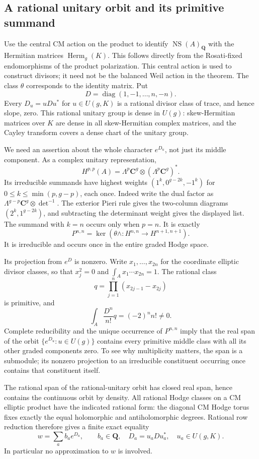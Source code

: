 \documentclass[11pt]{article}
\theoremstyle{definition}
\theoremstyle{remark}
\begin{document}
\subsection{A rational unitary orbit and its primitive summand}

Use the central CM action on the product to identify
$\operatorname{NS}(A)_{\mathbf Q}$ with the Hermitian matrices
$\operatorname{Herm}_g(K)$.  This follows directly from the
Rosati-fixed endomorphisms of the product polarization.
This central action is used to construct divisors; it need not be
the balanced Weil action in the theorem.  The class $\theta$
corresponds to the identity matrix.  Put
\[
 D=\operatorname{diag}(1,-1,\ldots,n,-n).
\]
Every $D_u=uDu^*$ for $u\in U(g,K)$ is a rational divisor class
of trace, and hence slope, zero.  This rational unitary group is
dense in $U(g)$: skew-Hermitian matrices over $K$ are dense in all
skew-Hermitian complex matrices, and the Cayley transform covers
a dense chart of the unitary group.

We need an assertion about the whole character $e^{D_u}$, not just
its middle component.  As a complex unitary representation,
\[
 H^{p,p}(A)=\Lambda^p\mathbf C^g\otimes
                         (\Lambda^p\mathbf C^g)^*.
\]
Its irreducible summands have highest weights
$(1^k,0^{g-2k},-1^k)$ for $0\le k\le\min(p,g-p)$, each once.
Indeed write the dual factor as
$\Lambda^{g-p}\mathbf C^g\otimes\det^{-1}$.
The exterior Pieri rule gives the two-column diagrams
$(2^k,1^{g-2k})$, and subtracting the determinant weight gives
the displayed list.  The summand with $k=n$ occurs only when
$p=n$.  It is exactly
\[
 P^{n,n}=\ker(\theta\wedge:H^{n,n}\longrightarrow H^{n+1,n+1}).
\]
It is irreducible and occurs once in the entire graded Hodge space.

Its projection from $e^D$ is nonzero.  Write $x_1,\ldots,x_{2n}$
for the coordinate elliptic divisor classes, so that $x_j^2=0$ and
$\int_Ax_1\cdots x_{2n}=1$.  The rational class
\[
 q=\prod_{j=1}^n(x_{2j-1}-x_{2j})
\]
is primitive, and
\[
 \int_A\frac{D^n}{n!}q=(-2)^n n!\ne0.
\]
Complete reducibility and the unique occurrence of $P^{n,n}$ imply
that the real span of the orbit $\{e^{D_u}:u\in U(g)\}$ contains
every primitive middle class with all its other graded components
zero.  To see why multiplicity matters, the span is a submodule;
its nonzero projection to an irreducible constituent occurring once
contains that constituent itself.

The rational span of the rational-unitary orbit has closed real
span, hence contains the continuous orbit by density.  All rational
Hodge classes on a CM elliptic product have the indicated rational
form: the diagonal CM Hodge torus fixes exactly the equal
holomorphic and antiholomorphic degrees.  Rational row reduction
therefore gives a finite exact equality
\begin{equation}
 w=\sum_a b_a e^{D_a},\qquad b_a\in\mathbf Q,
 \quad D_a=u_aDu_a^*,\quad u_a\in U(g,K).
 \label{eq:primitive-orbit-relation}
\end{equation}
In particular no approximation to $w$ is involved.
\end{document}
